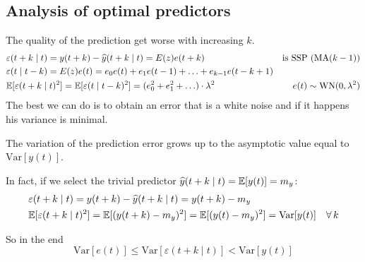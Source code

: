 \subsection{Analysis of optimal predictors}

The quality of the prediction get worse with increasing $k$.
\begin{align*}
    &\varepsilon(t+k\mid t)=y(t+k)-\widehat{y}(t+k\mid t)=E(z)e(t+k) &\text{is SSP (MA($k-1$))}\\
    &\varepsilon(t\mid t-k)=E(z)e(t)=e_0e(t)+e_1e(t-1)+\ldots+e_{k-1}e(t-k+1)\\
    &\mathbb{E}[\varepsilon(t+k\mid t)^2]=\mathbb{E}[\varepsilon(t\mid t-k)^2]=(e_0^2+e_1^2+\ldots)\cdot\lambda^2 &e(t)\sim \operatorname{WN}(0,\lambda^2)
\end{align*}
The best we can do is to obtain an error that is a white noise and if it happens his variance is minimal.

The variation of the prediction error grows up to the asymptotic value equal to $\mathrm{Var}[y(t)]$.

In fact, if we select the trivial predictor $\widehat y(t+k\mid t)=\mathbb{E}[y(t)]=m_y$:
\begin{align*}
    &\varepsilon(t+k\mid t)=y(t+k)-\hat y(t+k\mid t)=y(t+k)-m_y\\
    &\E[\varepsilon(t+k\mid t)^2]=\E[(y(t+k)-m_y)^2]=\E[(y(t)-m_y)^2]=\mathrm{Var} [y(t)]\quad\forall k
\end{align*}

So in the end
\[
\boxed{\mathrm{Var}[e(t)]\leq\mathrm{Var}[\varepsilon(t+k\mid t)]<\mathrm{Var}[y(t)]}
\]


